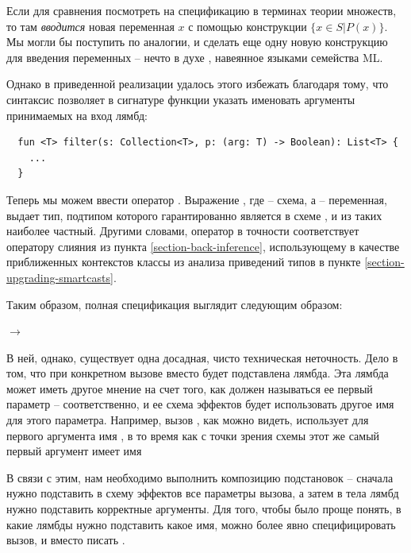 Если для сравнения посмотреть на спецификацию  в терминах теории множеств, то там \emph{вводится} новая переменная $x$ с помощью конструкции $\{ x \in S | P(x) \}$. Мы могли бы поступить по аналогии, и сделать еще одну новую конструкцию для введения переменных -- нечто в духе , навеянное языками семейства ML.

Однако в приведенной реализации удалось этого избежать благодаря тому, что синтаксис  позволяет в сигнатуре функции указать именовать аргументы принимаемых на вход лямбд:

\begin{verbatim}
  fun <T> filter(s: Collection<T>, p: (arg: T) -> Boolean): List<T> {
    ...
  }
\end{verbatim}

Теперь мы можем ввести оператор . Выражение , где  -- схема, а  -- переменная, выдает тип, подтипом которого гарантированно является  в схеме , и из таких наиболее частный. Другими словами, оператор  в точности соответствует оператору слияния из пункта \ref{section-back-inference}, использующему в качестве приближенных контекстов классы  из анализа приведений типов в пункте \ref{section-upgrading-smartcasts}.

Таким образом, полная спецификация  выглядит следующим образом:

{
   $\rightarrow$ 
}{}

В ней, однако, существует одна досадная, чисто техническая неточность. Дело в том, что при конкретном вызове  вместо  будет подставлена лямбда. Эта лямбда может иметь другое мнение на счет того, как должен называться ее первый параметр -- соответственно, и ее схема эффектов будет использовать другое имя для этого параметра. Например, вызов , как можно видеть, использует для первого аргумента имя , в то время как с точки зрения схемы этот же самый первый аргумент имеет имя 

В связи с этим, нам необходимо выполнить композицию подстановок -- сначала нужно подставить в схему эффектов  все параметры вызова, а затем в тела лямбд нужно подставить корректные аргументы. Для того, чтобы было проще понять, в какие лямбды нужно подставить какое имя, можно более явно специфицировать вызов, и вместо  писать .

